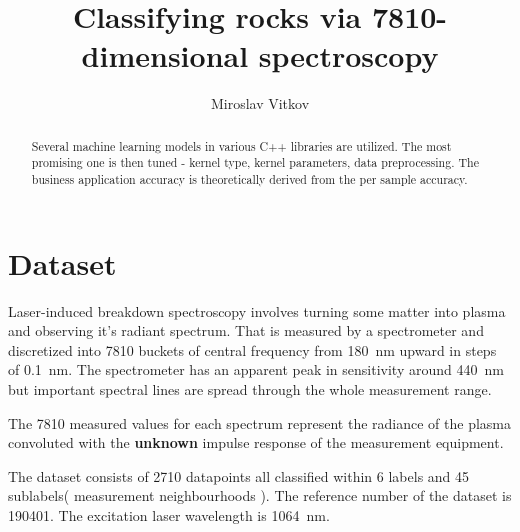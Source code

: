 \documentclass{article}
\title{Classifying rocks via 7810-dimensional spectroscopy}
\author{Miroslav Vitkov}
\begin{document}
\maketitle


\begin{abstract}
Several machine learning models in various C++ libraries are utilized.
The most promising one is then tuned - kernel type, kernel parameters, data preprocessing.
The business application accuracy is theoretically derived from the per sample accuracy.
\end{abstract}


\section{Dataset}
Laser-induced breakdown spectroscopy\cite{libs_intro} involves turning some matter into plasma and observing it's radiant spectrum.
That is measured by a spectrometer and discretized into 7810 buckets of central frequency from  \SI{180}{\nano\metre} upward in steps of \SI{0.1}{\nano\metre}.
The spectrometer has an apparent peak in sensitivity around \SI{440}{\nano\metre} but important spectral lines are spread through the whole measurement range.
\par
The 7810 measured values for each spectrum represent the radiance\cite{radiance} of the plasma convoluted with the \textbf{unknown} impulse response of the measurement equipment.
\par
The dataset consists of 2710 datapoints all classified within 6 labels and 45 sublabels( measurement neighbourhoods ).
The reference number of the dataset is 190401.
The excitation laser wavelength is \SI{1064}{\nano\metre}.
\end{document}
